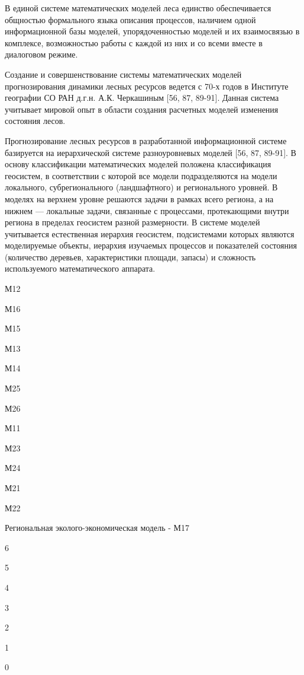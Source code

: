 \documentclass{article}
\begin{document}
В единой системе математических моделей леса 
единство обеспечивается общностью формального 
языка описания процессов, наличием одной информационной 
базы моделей, упорядоченностью моделей и их 
взаимосвязью в комплексе, возможностью работы 
с каждой из них и со всеми вместе в диалоговом 
режиме.

Создание и совершенствование системы математических 
моделей прогнозирования динамики лесных ресурсов 
ведется с 70-х годов в Институте географии СО 
РАН д.г.н. А.К. Черкашиным [56, 87, 89-91]. Данная система 
учитывает мировой опыт в области создания расчетных 
моделей изменения состояния лесов. 

Прогнозирование лесных ресурсов в разработанной 
информационной системе базируется на иерархической 
системе разноуровневых моделей [56, 87, 89-91]. В 
основу классификации математических моделей 
положена классификация геосистем, в соответствии 
с которой все модели подразделяются на модели 
локального, субрегионального  (ландшафтного) 
и регионального уровней.  В моделях на верхнем 
уровне решаются задачи в рамках всего региона, 
а на нижнем --- локальные задачи, связанные с 
процессами, протекающими внутри региона в пределах 
геосистем разной размерности. В системе моделей 
учитывается естественная иерархия геосистем, 
подсистемами которых являются моделируемые 
объекты, иерархия изучаемых процессов и показателей 
состояния (количество деревьев, характеристики 
площади, запасы) и сложность используемого 
математического аппарата.

\begin{center}
М12

М16

М15

М13

М14

М25

М26

М11

М23

М24

М21

М22

Региональная эколого-экономическая модель 
- М17
\end{center}

6

5

4

3

2

1

0
\end{document}
